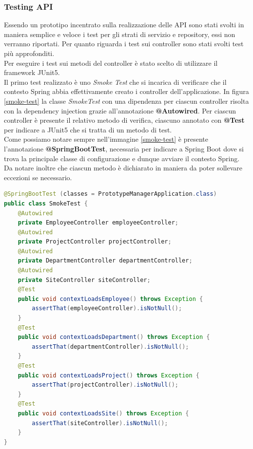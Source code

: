 \subsubsection*{Testing API}
Essendo un prototipo incentrato sulla realizzazione delle API sono stati svolti in maniera semplice e veloce i test per gli strati di servizio e repository, essi non verranno riportati. Per quanto riguarda i test sui controller sono stati svolti test più approfonditi.\\
Per eseguire i test sui metodi del controller è stato scelto di utilizzare il framework JUnit5.\\
Il primo test realizzato è uno \textit{Smoke Test} che si incarica di verificare che il contesto Spring abbia effettivamente creato i controller dell'applicazione. In figura \ref{smoke-test} la classe \textit{SmokeTest} con una dipendenza per ciascun controller risolta con la dependency injection grazie all'annotazione \textbf{@Autowired}. Per ciascun controller è presente il relativo metodo di verifica, ciascuno annotato con \textbf{@Test} per indicare a JUnit5 che si tratta di un metodo di test.\\
Come possiamo notare sempre nell'immagine \ref{smoke-test} è presente l'annotazione \textbf{@SpringBootTest}, necessaria per indicare a Spring Boot dove si trova la principale classe di configurazione e dunque avviare il contesto Spring. Da notare inoltre che ciascun metodo è dichiarato in maniera da poter sollevare eccezioni se necessario.
\begin{lstlisting}[language=Java, morecomment={[s][\color{DarkOrchid}]{@}{\ }},  morecomment={[s][\color{OliveGreen}]{"}{"}},]
@SpringBootTest (classes = PrototypeManagerApplication.class)
public class SmokeTest {
    @Autowired
    private EmployeeController employeeController;
    @Autowired
    private ProjectController projectController;
    @Autowired
    private DepartmentController departmentController;
    @Autowired
    private SiteController siteController;
    @Test
    public void contextLoadsEmployee() throws Exception {
        assertThat(employeeController).isNotNull();
    }
    @Test
    public void contextLoadsDepartment() throws Exception {
        assertThat(departmentController).isNotNull();
    }
    @Test
    public void contextLoadsProject() throws Exception {
        assertThat(projectController).isNotNull();
    }
    @Test
    public void contextLoadsSite() throws Exception {
        assertThat(siteController).isNotNull();
    }
}
\end{lstlisting}
